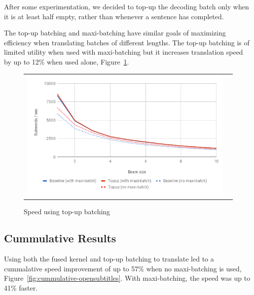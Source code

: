 \documentclass[11pt,a4paper]{article}
\begin{document}
After some experimentation, we decided to top-up the decoding batch only when it is at least half empty, rather than whenever a sentence has completed.

The top-up batching and maxi-batching have similar goals of maximizing efficiency when translating batches of different lengths. The top-up batching is of limited utility when used with maxi-batching but it increases translation speed by up to 12\% when used alone, Figure~\ref{fig:topup-opensubtitles}.

\begin{figure}
\centering
\begin{tabular}{cc}
{\includegraphics[scale=0.3]{topup-opensubtitles.png}} 
\end{tabular}
\caption{Speed using top-up batching}
\label{fig:topup-opensubtitles}
\end{figure} 

\subsection{Cummulative Results}

Using both the fused kernel and top-up batching to translate led to a cummalative speed improvement of up to 57\% when no maxi-batching is used, Figure~\ref{fig:cummulative-opensubtitles}. With maxi-batching, the speed was up to 41\% faster.
\end{document}
